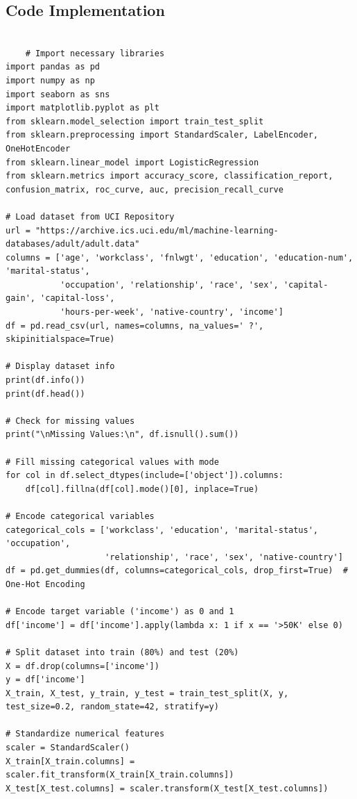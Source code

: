 \documentclass[a4paper,12pt]{article}
\begin{document}
\subsection{Code Implementation}
\begin{lstlisting}[style=python]

    # Import necessary libraries
import pandas as pd
import numpy as np
import seaborn as sns
import matplotlib.pyplot as plt
from sklearn.model_selection import train_test_split
from sklearn.preprocessing import StandardScaler, LabelEncoder, OneHotEncoder
from sklearn.linear_model import LogisticRegression
from sklearn.metrics import accuracy_score, classification_report, confusion_matrix, roc_curve, auc, precision_recall_curve

# Load dataset from UCI Repository
url = "https://archive.ics.uci.edu/ml/machine-learning-databases/adult/adult.data"
columns = ['age', 'workclass', 'fnlwgt', 'education', 'education-num', 'marital-status',
           'occupation', 'relationship', 'race', 'sex', 'capital-gain', 'capital-loss',
           'hours-per-week', 'native-country', 'income']
df = pd.read_csv(url, names=columns, na_values=' ?', skipinitialspace=True)

# Display dataset info
print(df.info())
print(df.head())

# Check for missing values
print("\nMissing Values:\n", df.isnull().sum())

# Fill missing categorical values with mode
for col in df.select_dtypes(include=['object']).columns:
    df[col].fillna(df[col].mode()[0], inplace=True)

# Encode categorical variables
categorical_cols = ['workclass', 'education', 'marital-status', 'occupation',
                    'relationship', 'race', 'sex', 'native-country']
df = pd.get_dummies(df, columns=categorical_cols, drop_first=True)  # One-Hot Encoding

# Encode target variable ('income') as 0 and 1
df['income'] = df['income'].apply(lambda x: 1 if x == '>50K' else 0)

# Split dataset into train (80%) and test (20%)
X = df.drop(columns=['income'])
y = df['income']
X_train, X_test, y_train, y_test = train_test_split(X, y, test_size=0.2, random_state=42, stratify=y)

# Standardize numerical features
scaler = StandardScaler()
X_train[X_train.columns] = scaler.fit_transform(X_train[X_train.columns])
X_test[X_test.columns] = scaler.transform(X_test[X_test.columns])


\end{lstlisting}
\end{document}
